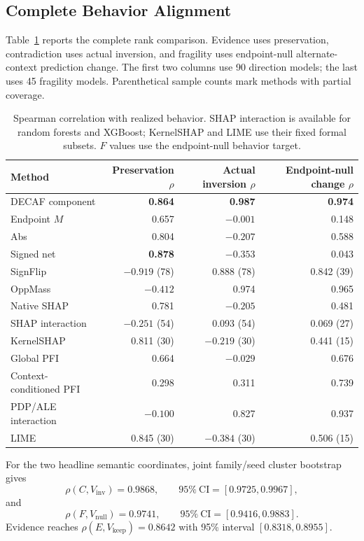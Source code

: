\subsection{Complete Behavior Alignment}
\label{app:covertype-complete-ranks}

Table~\ref{tab:covertype-complete-ranks} reports the complete rank comparison. Evidence uses preservation, contradiction uses actual inversion, and fragility uses endpoint-null alternate-context prediction change. The first two columns use 90 direction models; the last uses 45 fragility models. Parenthetical sample counts mark methods with partial coverage.

\begin{table}[t]
\centering
\caption{Spearman correlation with realized behavior. SHAP interaction is available for random forests and XGBoost; KernelSHAP and LIME use their fixed formal subsets. $F$ values use the endpoint-null behavior target.}
\label{tab:covertype-complete-ranks}
\footnotesize
\setlength{\tabcolsep}{5pt}
\begin{tabular}{lrrr}
\toprule
Method & Preservation $\rho$ & Actual inversion $\rho$ & Endpoint-null change $\rho$ \\
\midrule
DECAF component & \textbf{0.864} & \textbf{0.987} & \textbf{0.974} \\
Endpoint $M$ & 0.657 & $-0.001$ & 0.148 \\
Abs & 0.804 & $-0.207$ & 0.588 \\
Signed net & \textbf{0.878} & $-0.353$ & 0.043 \\
SignFlip & $-0.919$ (78) & 0.888 (78) & 0.842 (39) \\
OppMass & $-0.412$ & 0.974 & 0.965 \\
Native SHAP & 0.781 & $-0.205$ & 0.481 \\
SHAP interaction & $-0.251$ (54) & 0.093 (54) & 0.069 (27) \\
KernelSHAP & 0.811 (30) & $-0.219$ (30) & 0.441 (15) \\
Global PFI & 0.664 & $-0.029$ & 0.676 \\
Context-conditioned PFI & 0.298 & 0.311 & 0.739 \\
PDP/ALE interaction & $-0.100$ & 0.827 & 0.937 \\
LIME & 0.845 (30) & $-0.384$ (30) & 0.506 (15) \\
\bottomrule
\end{tabular}
\end{table}

For the two headline semantic coordinates, joint family/seed cluster bootstrap gives
\[
\rho(C,V_{\mathrm{inv}})=0.9868,
\qquad 95\%\ \mathrm{CI}=[0.9725,0.9967],
\]
and
\[
\rho(F,V_{\mathrm{null}})=0.9741,
\qquad 95\%\ \mathrm{CI}=[0.9416,0.9883].
\]
Evidence reaches $\rho(E,V_{\mathrm{keep}})=0.8642$ with 95\% interval $[0.8318,0.8955]$.

